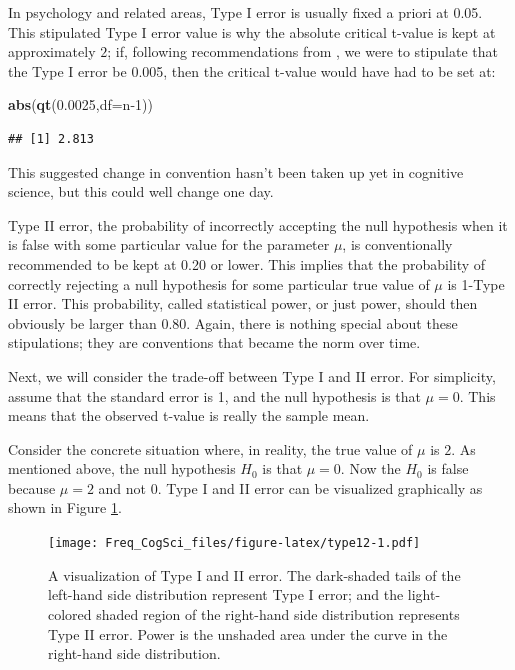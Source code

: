 \documentclass[12pt,]{krantz}
\newenvironment{Shaded}{\begin{snugshade}}{\end{snugshade}}
\newcommand{\DataTypeTok}[1]{\textcolor[rgb]{0.13,0.29,0.53}{#1}}
\newcommand{\DecValTok}[1]{\textcolor[rgb]{0.00,0.00,0.81}{#1}}
\newcommand{\FloatTok}[1]{\textcolor[rgb]{0.00,0.00,0.81}{#1}}
\newcommand{\KeywordTok}[1]{\textcolor[rgb]{0.13,0.29,0.53}{\textbf{#1}}}
\newcommand{\NormalTok}[1]{#1}
\begin{document}
In psychology and related areas, Type I error is usually fixed a priori at 0.05. This stipulated Type I error value is why the absolute critical t-value is kept at approximately \(2\); if, following recommendations from \citet{benjamin2018redefine}, we were to stipulate that the Type I error be 0.005, then the critical t-value would have had to be set at:

\begin{Shaded}
\begin{Highlighting}[]
\KeywordTok{abs}\NormalTok{(}\KeywordTok{qt}\NormalTok{(}\FloatTok{0.0025}\NormalTok{,}\DataTypeTok{df=}\NormalTok{n}\DecValTok{-1}\NormalTok{))}
\end{Highlighting}
\end{Shaded}

\begin{verbatim}
## [1] 2.813
\end{verbatim}

This suggested change in convention hasn't been taken up yet in cognitive science, but this could well change one day.

Type II error, the probability of incorrectly accepting the null hypothesis when it is false with some particular value for the parameter \(\mu\), is conventionally recommended \citep{powerbookcohen} to be kept at 0.20 or lower. This implies that the probability of correctly rejecting a null hypothesis for some particular true value of \(\mu\) is 1-Type II error. This probability, called statistical power, or just power, should then obviously be larger than 0.80. Again, there is nothing special about these stipulations; they are conventions that became the norm over time.

Next, we will consider the trade-off between Type I and II error. For simplicity, assume that the standard error is 1, and the null hypothesis is that \(\mu=0\). This means that the observed t-value is really the sample mean.

Consider the concrete situation where, in reality, the true value of \(\mu\) is \(2\). As mentioned above, the null hypothesis \(H_0\) is that \(\mu=0\). Now the \(H_0\) is false because \(\mu=2\) and not \(0\). Type I and II error can be visualized graphically as shown in Figure \ref{fig:type12}.

\begin{figure}
\centering
\texttt{[image: Freq\_CogSci\_files/figure-latex/type12-1.pdf]}
\caption{\label{fig:type12}A visualization of Type I and II error. The dark-shaded tails of the left-hand side distribution represent Type I error; and the light-colored shaded region of the right-hand side distribution represents Type II error. Power is the unshaded area under the curve in the right-hand side distribution.}
\end{figure}
\end{document}
